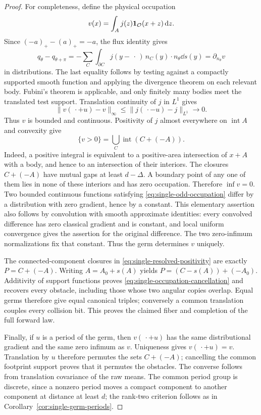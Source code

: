 \begin{proof}
For completeness, define the physical occupation
\[
                 v(x)=\int_A j(z)\mathbf 1_{\mathcal O}(x+z)\,\mathrm d z.
\]
Since $(-a)_+-(a)_+=-a$, the flux identity gives
\begin{equation}\label{eq:single-odd-flux}
 q_\theta-q_{\theta+\pi}
   =-\sum_C\int_{\partial C}
          j(y-\,\cdot\,)\,n_C(y)\cdot n_\theta\dd s(y)
   =\partial_{n_\theta}v
\end{equation}
in distributions.  The last equality follows by testing against a
compactly supported smooth function and applying the divergence
theorem on each relevant body.  Fubini's theorem is applicable,
and only finitely many bodies meet the translated test support.
Translation continuity of $j$ in $L^1$ gives
\[
 \|v(\,\cdot+u)-v\|_\infty
                    \le\|j(\,\cdot-u)-j\|_{L^1}\longrightarrow0.
\]
Thus $v$ is bounded and continuous.  Positivity of $j$ almost
everywhere on $\operatorname{int}A$ and convexity give
\begin{equation}\label{eq:single-resolved-positivity}
        \{v>0\}=\bigcup_C\operatorname{int}(C+(-A)).
\end{equation}
Indeed, a positive integral is equivalent to a positive-area
intersection of $x+A$ with a body, and hence to an intersection of
their interiors.  The closures $C+(-A)$ have mutual gaps at least
$d-\Delta$.  A boundary point of any one of them lies in none of
these interiors and has zero occupation.  Therefore $\inf v=0$.
Two bounded continuous functions satisfying
\eqref{eq:single-odd-occupation} differ by a distribution with
zero gradient, hence by a constant.  This elementary assertion
also follows by convolution with smooth approximate identities:
every convolved difference has zero classical gradient and is
constant, and local uniform convergence gives the assertion for
the original difference.  The two zero-infimum normalizations
fix that constant.  Thus the germ determines $v$ uniquely.

The connected-component closures in
\eqref{eq:single-resolved-positivity} are exactly $P=C+(-A)$.
Writing $A=A_0+s(A)$ yields
$P=(C-s(A))+(-A_0)$.  Additivity of support functions proves
\eqref{eq:single-occupation-cancellation} and recovers every
obstacle, including those whose two angular copies overlap.
Equal germs therefore give equal canonical triples; conversely
a common translation couples every collision bit.  This proves
the claimed fiber and completion of the full forward law.

Finally, if $u$ is a period of the germ, then
$v(\,\cdot+u)$ has the same distributional gradient and the same
zero infimum as $v$.  Uniqueness gives $v(\,\cdot+u)=v$.
Translation by $u$ therefore permutes the sets $C+(-A)$;
cancelling the common footprint support proves that it permutes
the obstacles.  The converse follows from translation covariance
of the raw means.  The common period group is discrete, since a
nonzero period moves a compact component to another component at
distance at least $d$; the rank-two criterion follows as in
Corollary~\ref{cor:single-germ-periods}.
\end{proof}
